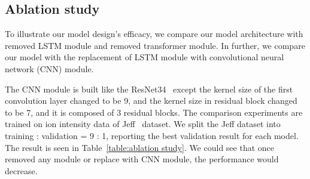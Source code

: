 \subsection{Ablation study}
To illustrate our model design's efficacy, we compare our model architecture with removed LSTM module and removed transformer module. In further, we compare our model with the replacement of LSTM module with convolutional neural network (CNN) module.

The CNN module is built like the ResNet34~\cite{he2015deep} except the kernel size of the first convolution layer changed to be 9, and the kernel size in residual block changed to be 7, and it is composed of 3 residual blocks.
The comparison experiments are trained on ion intensity data of Jeff~\cite{liu2018vivo} dataset. We split the Jeff dataset into training : validation = 9 : 1, reporting the best validation result for each model. The result is seen in Table~\ref{table:ablation study}. We could see that once removed any module or replace with CNN module, the performance would decrease. 
